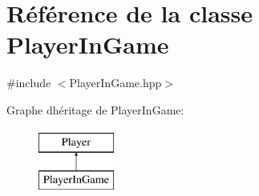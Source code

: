 \hypertarget{classPlayerInGame}{}\section{Référence de la classe Player\+In\+Game}
\label{classPlayerInGame}


{\ttfamily \#include $<$Player\+In\+Game.\+hpp$>$}

Graphe d\textquotesingle{}héritage de Player\+In\+Game\+:\begin{figure}[H]
\begin{center}
\leavevmode
\includegraphics[height=2.000000cm]{classPlayerInGame}
\end{center}
\end{figure}
